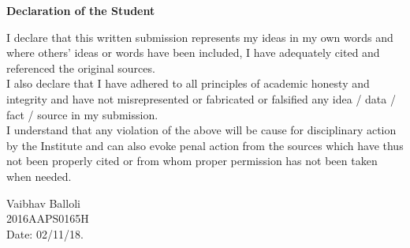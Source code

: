 \thispagestyle{empty}
\begin{center}
\vfill
\textbf{\Large{Declaration of the Student}}
\end{center}
\vfill

\large {I declare that this written submission represents my ideas in my own words and where
others' ideas or words have been included, I have adequately cited and referenced the
original sources.\\

I also declare that I have adhered to all principles of academic honesty and integrity and
have not misrepresented or fabricated or falsified any idea / data / fact / source in my
submission.\\

I understand that any violation of the above will be cause for disciplinary action by the
Institute and can also evoke penal action from the sources which have thus not been
properly cited or from whom proper permission has not been taken when needed.\\
}

\vfill

\begin{flushleft}
\large{
	Vaibhav Balloli\\
	[0.2cm]
	2016AAPS0165H\\
	[0.2cm]
	Date: 02/11/18.
}
\end{flushleft}